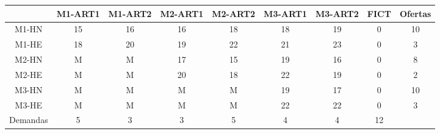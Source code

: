 \begin{tabular}{ccccccccc}
       & M1-ART1 & M1-ART2 & M2-ART1 & M2-ART2 & M3-ART1 & M3-ART2 & FICT   & Ofertas \bigstrut[b]\\
\hline
\hline
M1-HN  & 15     & 16     & 16     & 18     & 18     & 19     & 0      & 10 \bigstrut[t]\\
M1-HE  & 18     & 20     & 19     & 22     & 21     & 23     & 0      & 3 \\
M2-HN  & M      & M      & 17     & 15     & 19     & 16     & 0      & 8 \\
M2-HE  & M      & M      & 20     & 18     & 22     & 19     & 0      & 2 \\
M3-HN  & M      & M      & M      & M      & 19     & 17     & 0      & 10 \\
M3-HE  & M      & M      & M      & M      & 22     & 22     & 0      & 3 \bigstrut[b]\\
\hline
\hline
Demandas & 5      & 3      & 3      & 5      & 4      & 4      & 12     &  \bigstrut[t]\\
\end{tabular}%
